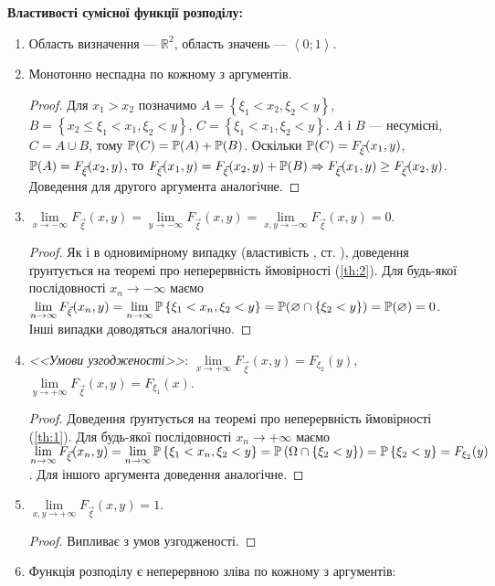 \noindent\textbf{Властивості сумісної функції розподілу:}
\begin{enumerate}
    \item Область визначення --- $\mathbb{R}^2$, область значень --- $\left<0; 1\right>$.
    \item Монотонно неспадна по кожному з аргументів.
    \begin{proof}
        Для $x_1 > x_2$ позначимо
        $A = \left\{\xi_1 < x_2, \xi_2 < y \right\}$, 
        $B = \left\{x_2 \leq \xi_1 < x_1,\xi_2<y\right\}$, 
        $C = \left\{\xi_1 < x_1, \xi_2 < y\right\}$.
        $A$ і $B$ --- несумісні,
        $C = A \cup B$, тому $\P(C) = \P(A) + \P(B)$.
        Оскільки 
        $\P(C) = F_{\vec{\xi}}(x_1, y)$,  
        $\P(A) = F_{\vec{\xi}}(x_2, y)$, то 
        $F_{\vec{\xi}}(x_1, y) = F_{\vec{\xi}}(x_2, y) + \P(B)
        \Rightarrow F_{\vec{\xi}}(x_1, y) \geq  F_{\vec{\xi}}(x_2, y)$. 
        Доведення для другого аргумента аналогічне.
    \end{proof}
    \item $\lim\limits_{x \to -\infty} F_{\vec{\xi}}(x, y) = 
           \lim\limits_{y \to -\infty} F_{\vec{\xi}}(x, y) = 
           \lim\limits_{x,y \to -\infty} F_{\vec{\xi}}(x, y) = 0$.
    \begin{proof}
        Як і в одновимірному випадку (властивість , ст. \pageref{cdf:limit}),
        доведення ґрунтується на теоремі про неперервність 
        ймовірності (\ref{th:2}).
        Для будь-якої послідовності $x_n \to -\infty$ маємо
        $\lim\limits_{n \to \infty} F_{\vec{\xi}}(x_n, y) = 
        \lim\limits_{n \to \infty} \P\left\{\xi_1<x_n,\xi_2<y\right\} 
        = \P(\varnothing \cap \{\xi_2 < y\})
        = \P(\varnothing) = 0$.
        Інші випадки доводяться аналогічно.
    \end{proof}
    \item \emph{<<Умови узгодженості>>}:
    $\lim\limits_{x \to +\infty} F_{\vec{\xi}}(x, y) = F_{\xi_2}(y)$, 
    $\lim\limits_{y \to +\infty} F_{\vec{\xi}}(x, y) = F_{\xi_1}(x)$.
    \begin{proof}
        Доведення ґрунтується на теоремі про неперервність 
        ймовірності (\ref{th:1}). Для будь-якої
        послідовності $x_n \to +\infty$ маємо
        $\lim\limits_{n \to \infty} F_{\vec{\xi}}(x_n, y) = 
        \lim\limits_{n \to \infty} 
        \P\left\{\xi_1 < x_n, \xi_2 < y\right\} = 
        \P\left(\Omega \cap \left\{\xi_2<y\right\}\right) = 
        \P\left\{\xi_2<y\right\} = F_{\xi_2}(y)$. 
        Для іншого аргумента доведення аналогічне.
    \end{proof}
    \item $\lim\limits_{x,y \to +\infty} F_{\vec{\xi}}(x, y) = 1$.
    \begin{proof}
        Випливає з умов узгодженості.
    \end{proof}
    \item Функція розподілу є неперервною зліва по кожному з аргументів: 
    

\end{enumerate}
